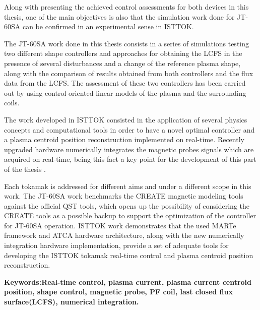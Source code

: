 	Along with presenting the achieved control assessments for both devices in this thesis, one of the main objectives  is also that the simulation work done for JT-60SA can be confirmed in an experimental sense in ISTTOK. \smallskip
	
	
	The JT-60SA work done in this thesis consists in a series of simulations testing two different shape controllers and  approaches for obtaining the LCFS  in the presence of several disturbances and a change of the reference plasma shape, along with the comparison of results obtained from both controllers and the flux data from the LCFS.   The assessment of these two controllers has been carried out by using control-oriented linear models of the plasma and the surrounding coils.\smallskip
	
	The work developed in ISTTOK consisted in the application of several physics concepts and computational tools in order to have a novel optimal controller and a plasma centroid position reconstruction implemented on real-time. Recently upgraded hardware numerically integrates  the magnetic probes signals which are acquired on real-time, being this fact a key point for the development of this part of the thesis .\smallskip
	
	
	
	
	Each tokamak is addressed for different aims and under a different scope in this work. The JT-60SA work benchmarks the CREATE magnetic modeling tools against the official QST tools, which opens up the possibility of considering the CREATE tools as a possible backup to support the optimization of the controller for JT-60SA operation. ISTTOK work demonstrates that the used MARTe framework and ATCA hardware architecture, along with the new numerically integration hardware implementation, provide a set of adequate tools for developing the ISTTOK tokamak real-time control and plasma centroid position reconstruction.
	
	
	
	\textbf{Keywords:Real-time control, plasma current, plasma current centroid position,   shape control, magnetic probe, PF coil, last closed flux surface(LCFS), numerical integration.} 
